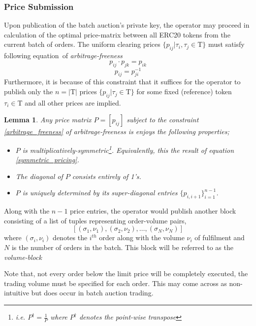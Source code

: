 \documentclass[11pt,parskip=full]{scrartcl}%
\newcommand{\Tau}{\mathrm{T}}
\newtheorem{lemma}[theorem]{Lemma}
\newcommand*{\erc}{ERC20 }
\begin{document}
\subsubsection{Price Submission}
Upon publication of the batch auction's private key, the operator may proceed in calculation of the optimal price-matrix between all \erc tokens from the current batch of orders. 
The uniform clearing prices $\{p_{ij}| \tau_i, \tau_j \in \Tau \}$  must satisfy following equation of \emph{arbitrage-freeness} 
\begin{equation}\label{arbitrage_freeness}
p_{ij} \cdot p_{jk} = p_{ik}
\end{equation}
\begin{equation}\label{symmetric_pricing}
p_{ij} = p_{ji}^{-1}
\end{equation}
Furthermore, it is because of this constraint that it suffices for the operator to publish only the $n=|\Tau|$ prices $\{p_{ij}| \tau_j \in \Tau \}$ for some fixed (reference) token $ \tau_i \in \Tau$ and all other prices are implied.

\begin{lemma}
Any price matrix $P = [p_{ij}]$ subject to the constraint \ref{arbitrage_freeness} of arbitrage-freeness is enjoys the following properties;
\begin{itemize}
\item[(i)] $P$ is multiplicatively-symmetric\footnote{i.e. $P^\dagger = \frac{1}{P}$ where $P^\dagger$ denotes the point-wise transpose}. Equivalently, this the result of equation \ref{symmetric_pricing}.
\item[(ii)] The diagonal of $P$ consists entirely of 1's.
\item[(iii)]  $P$ is uniquely determined by its super-diagonal entries $\{p_{i, i+1}\}_{i=1}^{n-1}$.
\end{itemize}
\end{lemma}

Along with the $n-1$ price entries, the operator would publish another block consisting of a list of tuples representing order-volume pairs, 
\[[(\sigma_1, \nu_1), (\sigma_2,  \nu_2), \dots, (\sigma_N, \nu_N)]\]
where $(\sigma_i, \nu_i)$ denotes the $i^{th}$ order along with the volume $\nu_i$ of fulfilment and $N$ is the number of orders in the batch. 
This block will be referred to as the \emph{volume-block}\label{volumeBlock}

Note that, not every order below the limit price will be completely executed, the trading volume must be specified for each order.
This may come across as non-intuitive but does occur in batch auction trading.
\end{document}

